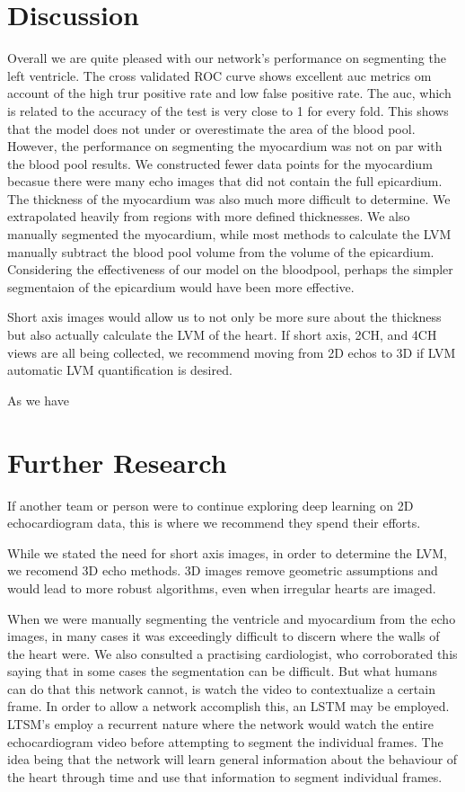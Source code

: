 \documentclass[12pt]{article}
\begin{document}
\section{Discussion}
Overall we are quite pleased with our network's performance on segmenting the left ventricle.
The cross validated ROC curve shows excellent auc metrics om account of the high trur positive rate and low false positive rate.
The auc, which is related to the accuracy of the test is very close to 1 for every fold.
This shows that the model does not under or overestimate the area of the blood pool.
However, the performance on segmenting the myocardium was not on par with the blood pool results.
We constructed fewer data points for the myocardium becasue there were many echo images that did not contain the full epicardium.
The thickness of the myocardium was also much more difficult to determine.
We extrapolated heavily from regions with more defined thicknesses.
We also manually segmented the myocardium, while most methods to calculate the LVM manually subtract the blood pool volume from the volume of the epicardium.
Considering the effectiveness of our model on the bloodpool, perhaps the simpler segmentaion of the epicardium would have been more effective.

Short axis images would allow us to not only be more sure about the thickness but also actually calculate the LVM of the heart.
If short axis, 2CH, and 4CH views are all being collected, we recommend moving from 2D echos to 3D if LVM automatic LVM quantification is desired.

As we have

\section{Further Research}
If another team or person were to continue exploring deep learning on 2D echocardiogram data, this is where we recommend they spend their efforts.

While we stated the need for short axis images, in order to determine the LVM, we recomend 3D echo methods.
3D images remove geometric assumptions and would lead to more robust algorithms, even when irregular hearts are imaged.

When we were manually segmenting the ventricle and myocardium from the echo images, in many cases it was exceedingly difficult to discern where the walls of the heart were.
We also consulted a practising cardiologist, who corroborated this saying that in some cases the segmentation can be difficult.
But what humans  can do that this network cannot, is watch the video to contextualize a certain frame.
In order to allow a network accomplish this, an LSTM may be employed.
LTSM's employ a recurrent nature where the network would watch the entire echocardiogram video before attempting to segment the individual frames.
The idea being that the network will learn general information about the behaviour of the heart through time and use that information to segment individual frames.
\end{document}
